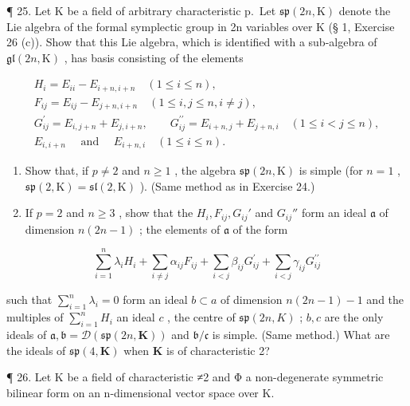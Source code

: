 ¶ 25. Let K be a field of arbitrary characteristic p.~Let \(\mathfrak{sp}(2n, \mathrm{K})\) denote the Lie algebra of the formal symplectic group in 2n variables over K (§ 1, Exercise 26 (c)). Show that this Lie algebra, which is identified with a sub-algebra of \(\mathfrak{gl}(2n, \mathrm{K})\) , has basis consisting of the elements

\[
\begin{array}{c} H _ {i} = E _ {i i} - E _ {i + n, i + n} \quad (1 \leqslant i \leqslant n), \\ F _ {i j} = E _ {i j} - E _ {j + n, i + n} \quad (1 \leqslant i, j \leqslant n, i \neq j), \\ G _ {i j} ^ {\prime} = E _ {i, j + n} + E _ {j, i + n}, \qquad G _ {i j} ^ {\prime \prime} = E _ {i + n, j} + E _ {j + n, i} \quad (1 \leqslant i <   j \leqslant n), \\ E _ {i, i + n} \quad \text { and } \quad E _ {i + n, i} \quad (1 \leqslant i \leqslant n). \end{array}
\]

\begin{enumerate}
\def\labelenumi{(\alph{enumi})}
\item
  Show that, if \(p \neq 2\) and \(n \geqslant 1\) , the algebra \(\mathfrak{sp}(2n, \mathrm{K})\) is simple (for \(n = 1\) , \(\mathfrak{sp}(2, \mathrm{K}) = \mathfrak{sl}(2, \mathrm{K})\) ). (Same method as in Exercise 24.)
\item
  If \(p = 2\) and \(n \geqslant 3\) , show that the \(H_{i}, F_{ij}, G_{ij}'\) and \(G_{ij}''\) form an ideal \(\mathfrak{a}\) of dimension \(n(2n - 1)\) ; the elements of \(\mathfrak{a}\) of the form
\end{enumerate}

\[
\sum_ {i = 1} ^ {n} \lambda_ {i} H _ {i} + \sum_ {i \neq j} \alpha_ {i j} F _ {i j} + \sum_ {i <   j} \beta_ {i j} G _ {i j} ^ {\prime} + \sum_ {i <   j} \gamma_ {i j} G _ {i j} ^ {\prime \prime}
\]

such that \(\sum_{i=1}^{n} \lambda_i = 0\) form an ideal \(b \subset a\) of dimension \(n(2n - 1) - 1\) and the multiples of \(\sum_{i=1}^{n} H_i\) an ideal \(c\) , the centre of \(\mathfrak{sp}(2n, K)\) ; \(b, c\) are the only ideals of \(\mathfrak{a},\mathfrak{b} = \mathcal{D}(\mathfrak{sp}(2n,\mathbf{K}))\) and \(\mathfrak{b} / \mathfrak{c}\) is simple. (Same method.) What are the ideals of \(\mathfrak{sp}(4,\mathbf{K})\) when \(\mathbf{K}\) is of characteristic 2?

¶ 26. Let K be a field of characteristic ≠2 and Φ a non-degenerate symmetric bilinear form on an n-dimensional vector space over K.

